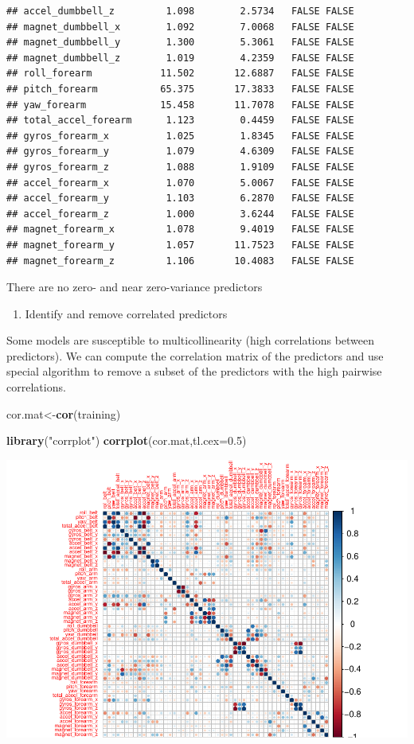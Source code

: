 \documentclass[]{article}
\newenvironment{Shaded}{\begin{snugshade}}{\end{snugshade}}
\newcommand{\KeywordTok}[1]{\textcolor[rgb]{0.13,0.29,0.53}{\textbf{{#1}}}}
\newcommand{\DataTypeTok}[1]{\textcolor[rgb]{0.13,0.29,0.53}{{#1}}}
\newcommand{\FloatTok}[1]{\textcolor[rgb]{0.00,0.00,0.81}{{#1}}}
\newcommand{\StringTok}[1]{\textcolor[rgb]{0.31,0.60,0.02}{{#1}}}
\newcommand{\NormalTok}[1]{{#1}}
\begin{document}
\begin{verbatim}
## accel_dumbbell_z         1.098        2.5734   FALSE FALSE
## magnet_dumbbell_x        1.092        7.0068   FALSE FALSE
## magnet_dumbbell_y        1.300        5.3061   FALSE FALSE
## magnet_dumbbell_z        1.019        4.2359   FALSE FALSE
## roll_forearm            11.502       12.6887   FALSE FALSE
## pitch_forearm           65.375       17.3833   FALSE FALSE
## yaw_forearm             15.458       11.7078   FALSE FALSE
## total_accel_forearm      1.123        0.4459   FALSE FALSE
## gyros_forearm_x          1.025        1.8345   FALSE FALSE
## gyros_forearm_y          1.079        4.6309   FALSE FALSE
## gyros_forearm_z          1.088        1.9109   FALSE FALSE
## accel_forearm_x          1.070        5.0067   FALSE FALSE
## accel_forearm_y          1.103        6.2870   FALSE FALSE
## accel_forearm_z          1.000        3.6244   FALSE FALSE
## magnet_forearm_x         1.078        9.4019   FALSE FALSE
## magnet_forearm_y         1.057       11.7523   FALSE FALSE
## magnet_forearm_z         1.106       10.4083   FALSE FALSE
\end{verbatim}

There are no zero- and near zero-variance predictors

\begin{enumerate}
\def\labelenumi{\arabic{enumi}.}
\setcounter{enumi}{3}
\itemsep1pt\parskip0pt
\item
  Identify and remove correlated predictors
\end{enumerate}

Some models are susceptible to multicollinearity (high correlations
between predictors). We can compute the correlation matrix of the
predictors and use special algorithm to remove a subset of the
predictors with the high pairwise correlations.

\begin{Shaded}
\begin{Highlighting}[]
\NormalTok{cor.mat<-}\KeywordTok{cor}\NormalTok{(training)}

\KeywordTok{library}\NormalTok{(}\StringTok{"corrplot"}\NormalTok{)}
\KeywordTok{corrplot}\NormalTok{(cor.mat,}\DataTypeTok{tl.cex=}\FloatTok{0.5}\NormalTok{)}
\end{Highlighting}
\end{Shaded}

\includegraphics{./PML4PDF_files/figure-latex/unnamed-chunk-9.pdf}
\end{document}

